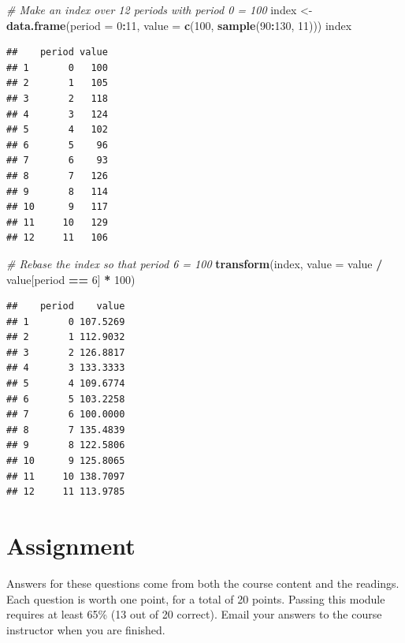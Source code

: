 \documentclass[]{article}
\newenvironment{Shaded}{\begin{snugshade}}{\end{snugshade}}
\newcommand{\CommentTok}[1]{\textcolor[rgb]{0.56,0.35,0.01}{\textit{#1}}}
\newcommand{\DataTypeTok}[1]{\textcolor[rgb]{0.13,0.29,0.53}{#1}}
\newcommand{\DecValTok}[1]{\textcolor[rgb]{0.00,0.00,0.81}{#1}}
\newcommand{\KeywordTok}[1]{\textcolor[rgb]{0.13,0.29,0.53}{\textbf{#1}}}
\newcommand{\NormalTok}[1]{#1}
\newcommand{\OperatorTok}[1]{\textcolor[rgb]{0.81,0.36,0.00}{\textbf{#1}}}
\newcommand{\StringTok}[1]{\textcolor[rgb]{0.31,0.60,0.02}{#1}}
\begin{document}
\begin{Shaded}
\begin{Highlighting}[]
\CommentTok{# Make an index over 12 periods with period 0 = 100}
\NormalTok{index <-}\StringTok{ }\KeywordTok{data.frame}\NormalTok{(}\DataTypeTok{period =} \DecValTok{0}\OperatorTok{:}\DecValTok{11}\NormalTok{, }\DataTypeTok{value =} \KeywordTok{c}\NormalTok{(}\DecValTok{100}\NormalTok{, }\KeywordTok{sample}\NormalTok{(}\DecValTok{90}\OperatorTok{:}\DecValTok{130}\NormalTok{, }\DecValTok{11}\NormalTok{)))}
\NormalTok{index}
\end{Highlighting}
\end{Shaded}

\begin{verbatim}
##    period value
## 1       0   100
## 2       1   105
## 3       2   118
## 4       3   124
## 5       4   102
## 6       5    96
## 7       6    93
## 8       7   126
## 9       8   114
## 10      9   117
## 11     10   129
## 12     11   106
\end{verbatim}

\begin{Shaded}
\begin{Highlighting}[]
\CommentTok{# Rebase the index so that period 6 = 100}
\KeywordTok{transform}\NormalTok{(index, }\DataTypeTok{value =}\NormalTok{ value }\OperatorTok{/}\StringTok{ }\NormalTok{value[period }\OperatorTok{==}\StringTok{ }\DecValTok{6}\NormalTok{] }\OperatorTok{*}\StringTok{ }\DecValTok{100}\NormalTok{)}
\end{Highlighting}
\end{Shaded}

\begin{verbatim}
##    period    value
## 1       0 107.5269
## 2       1 112.9032
## 3       2 126.8817
## 4       3 133.3333
## 5       4 109.6774
## 6       5 103.2258
## 7       6 100.0000
## 8       7 135.4839
## 9       8 122.5806
## 10      9 125.8065
## 11     10 138.7097
## 12     11 113.9785
\end{verbatim}

\hypertarget{assignment}{%
\section{Assignment}\label{assignment}}

Answers for these questions come from both the course content and the readings. Each question is worth one point, for a total of 20 points. Passing this module requires at least 65\% (13 out of 20 correct). Email your answers to the course instructor when you are finished.
\end{document}
